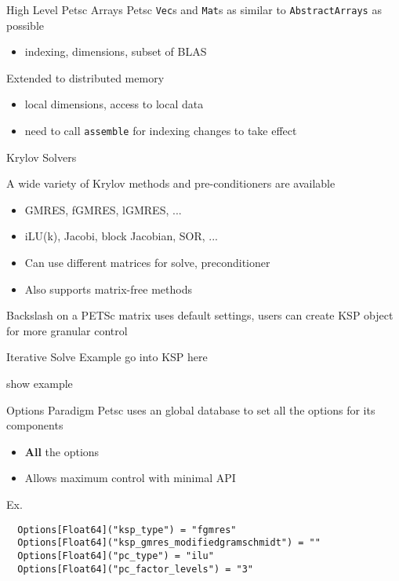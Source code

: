 \documentclass{beamer}
\begin{document}
\begin{frame}[fragile]{High Level Petsc Arrays}
Petsc \texttt{Vec}s and \texttt{Mat}s as similar to \texttt{AbstractArrays} as possible
\begin{itemize}
  \item indexing, dimensions, subset of BLAS
\end{itemize}
\hfill


Extended to distributed memory
\begin{itemize}
  \item local dimensions, access to local data
  \item need to call \texttt{assemble} for indexing changes to take effect
\end{itemize}

\end{frame}

\begin{frame}{Krylov Solvers}
\hfill

A wide variety of Krylov methods and pre-conditioners are available
\begin{itemize}
  \item GMRES, fGMRES, lGMRES, ...
  \item iLU(k), Jacobi, block Jacobian, SOR, ...
  \item Can use different matrices for solve, preconditioner
  \item Also supports matrix-free methods
\end{itemize}
\hfill

Backslash on a PETSc matrix uses default settings, users can create KSP object for more granular control
\end{frame}

\begin{frame}[fragile]{Iterative Solve Example}
go into KSP here

show example
\end{frame}

\begin{frame}[fragile]{Options Paradigm}
Petsc uses an global database to set all the options for its components
\begin{itemize}
  \item \textbf{All} the options
  \item Allows maximum control with minimal API
\end{itemize}
\hfill

Ex.
\begin{verbatim}
  Options[Float64]("ksp_type") = "fgmres"
  Options[Float64]("ksp_gmres_modifiedgramschmidt") = ""
  Options[Float64]("pc_type") = "ilu"
  Options[Float64]("pc_factor_levels") = "3"
\end{verbatim}

\end{frame}
\end{document}
